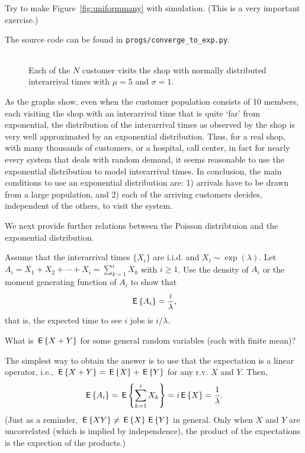 \begin{exercise}
  Try to make Figure~\ref{fig:uniformmany} with simulation. (This is a very important exercise.)
  \begin{solution}
    The source code can be found in \texttt{progs/converge\_to\_exp.py}.
\end{solution}
\end{exercise}

\begin{figure}[ht]
  \centering
  \begin{tabular}[h]{c}
 
  \end{tabular}
  \caption{Each of the $N$ customer visits the shop with normally
    distributed interarrival times with $\mu=5$ and
    $\sigma=1$.}  \label{fig:normal}
\end{figure}

As the graphs show, even when the customer population consists of 10
members, each visiting the shop with an interarrival time that is
quite `far' from exponential, the distribution of the interarrival
times as observed by the shop is very well approximated by an
exponential distribution. Thus, for a real shop, with many thousands
of customers, or a hospital, call center, in fact for nearly every
system that deals with random demand, it seems reasonable to use the
exponential distribution to model interarrival times.  In conclusion,
the main conditions to use an exponential distribution are: 1)
arrivals have to be drawn from a large population, and 2) each of the
arriving customers decides, independent of the others, to visit the
system.

We next provide further relations between the Poisson distribtuion and the exponential distribution. 

  \begin{exercise}
    Assume that the interarrival times $\{X_i\}$ are i.i.d. and
    $X_i\sim\exp(\lambda)$. Let
    $A_i=X_1+X_2+\cdots+X_i=\sum_{k=1}^i X_k$ with $i\geq 1$. Use the
    density of $A_i$ or the moment generating function of $A_i$ to
    show that
 \begin{equation*}
\,\mathsf{E}\left\{A_i\right\} = \frac i\lambda,
 \end{equation*}
 that is, the expected time to see $i$ jobs is $i/\lambda$.
 \begin{hint} What is $\,\mathsf{E}\left\{X+Y\right\}$ for some general random variables (each with finite mean)?
 \end{hint}
  \begin{solution}
The simplest way to obtain the answer is to use that the expectation is a linear operator, i.e., $\,\mathsf{E}\left\{X+Y\right\}= \,\mathsf{E}\left\{X\right\} + \,\mathsf{E}\left\{Y\right\}$ for any r.v. $X$ and $Y$. Then,
\begin{equation*}
\,\mathsf{E}\left\{A_i\right\} = \,\mathsf{E}\left\{\sum_{k=1}^i X_k\right\} = i \,\mathsf{E}\left\{X\right\} = \frac 1 \lambda.
\end{equation*}
(Just as a reminder, $\,\mathsf{E}\left\{XY\right\} \neq \,\mathsf{E}\left\{X\right\} \,\mathsf{E}\left\{Y\right\}$ in general. Only when $X$ and $Y$ are uncorrelated (which is implied by independence), the product of the expectations is the expection of the products.)

  \end{solution}
\end{exercise}

